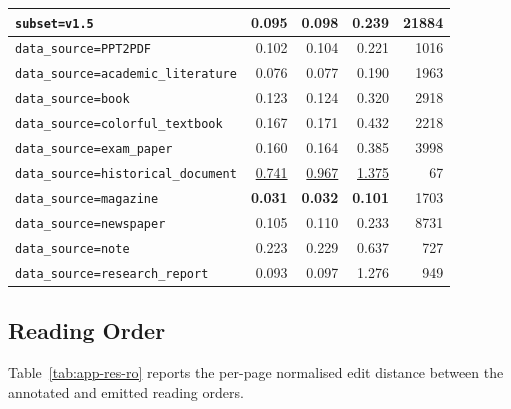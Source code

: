 \begin{table}[H]
\begin{tabular}{@{}l r r r r@{}}
    \texttt{subset=v1.5} & 0.095 & 0.098 & 0.239 & 21884 \\
    \midrule
    \texttt{data\_source=PPT2PDF} & 0.102 & 0.104 & 0.221 & 1016 \\
    \texttt{data\_source=academic\_literature} & 0.076 & 0.077 & 0.190 & 1963 \\
    \texttt{data\_source=book} & 0.123 & 0.124 & 0.320 & 2918 \\
    \texttt{data\_source=colorful\_textbook} & 0.167 & 0.171 & 0.432 & 2218 \\
    \texttt{data\_source=exam\_paper} & 0.160 & 0.164 & 0.385 & 3998 \\
    \texttt{data\_source=historical\_document} & \underline{0.741} & \underline{0.967} & \underline{1.375} & 67 \\
    \texttt{data\_source=magazine} & \textbf{0.031} & \textbf{0.032} & \textbf{0.101} & 1703 \\
    \texttt{data\_source=newspaper} & 0.105 & 0.110 & 0.233 & 8731 \\
    \texttt{data\_source=note} & 0.223 & 0.229 & 0.637 & 727 \\
    \texttt{data\_source=research\_report} & 0.093 & 0.097 & 1.276 & 949 \\
\bottomrule
\end{tabular}
\end{table}

\subsection{Reading Order}

Table~\ref{tab:app-res-ro} reports the per-page normalised edit distance between
the annotated and emitted reading orders.

